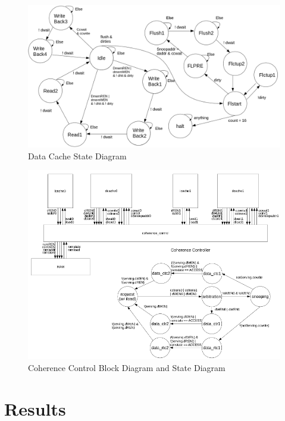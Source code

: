 \documentclass[12pt]{article}
\begin{document}
  \newpage
  \begin{figure}[hbp!]
    \begin{center}
      \includegraphics[width=.8\textwidth]{diagrams/dcache_state_machine.png}
    \end{center}

    \caption{Data Cache State Diagram}
		\label{fig:dcache_sd}
  \end{figure}

  \begin{figure}[hbp!]
    \begin{center}
      \includegraphics[width=.8\textwidth]{diagrams/diagram_coherence_control.png}
    \end{center}

    \caption{Coherence Control Block Diagram and State Diagram}
		\label{fig:coherence_control}
  \end{figure}

  \newpage
  \section{Results}
\end{document}
